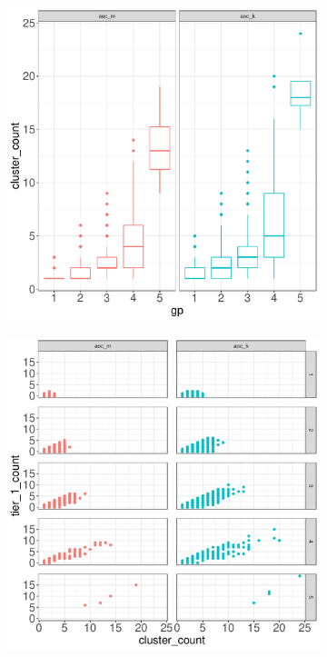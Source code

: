 \documentclass[12pt, oneside]{article}   	%
\begin{document}
\begin{figure}[H]
\centering
	\begin{subfigure}[t]{0.48\textwidth}
	 \centering
	 \includegraphics[width=\linewidth]{cluster_group.pdf} 
	 \end{subfigure}
 \hfill
	\begin{subfigure}[t]{0.48\textwidth}
        \centering
        \includegraphics[width=\linewidth]{tier_cluster.pdf} 

\end{subfigure}
\end{figure}
\end{document}
